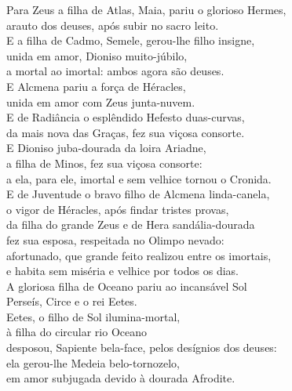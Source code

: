 \begin{pages}
\begin{Rightside}
\quad{}Para Zeus a filha de Atlas, Maia, pariu o glorioso Hermes,\\
arauto dos deuses, após subir no sacro leito.\\

\quad{}E a filha de Cadmo, Semele, gerou-lhe filho insigne, \\
unida em amor, Dioniso muito-júbilo,\\
a mortal ao imortal: ambos agora são deuses.\\

\quad{}E Alcmena pariu a força de Héracles,\\
unida em amor com Zeus junta-nuvem.\\

\quad{}E de Radiância o esplêndido Hefesto duas-curvas, \\
da mais nova das Graças, fez sua viçosa consorte.\\

\quad{}E Dioniso juba-dourada da loira Ariadne,\\
a filha de Minos, fez sua viçosa consorte:\\
a ela, para ele, imortal e sem velhice tornou o Cronida.\\

\quad{}E de Juventude o bravo filho de Alcmena linda-canela, \\
o vigor de Héracles, após findar tristes provas,\\
da filha do grande Zeus e de Hera sandália-dourada\\
fez sua esposa, respeitada no Olimpo nevado:\\
afortunado, que grande feito realizou entre os imortais,\\
e habita sem miséria e velhice por todos os dias. \\

\quad{}A gloriosa filha de Oceano pariu ao incansável Sol\\
Perseís, Circe e o rei Eetes.\\
Eetes, o filho de Sol ilumina-mortal,\\
à filha do circular rio Oceano\\
desposou, Sapiente bela-face, pelos desígnios dos deuses: \\
ela gerou-lhe Medeia belo-tornozelo,\\
em amor subjugada devido à dourada Afrodite.\\

\smallskip
\begin{center}\end{center}
\smallskip


\end{Rightside}
\end{pages}
